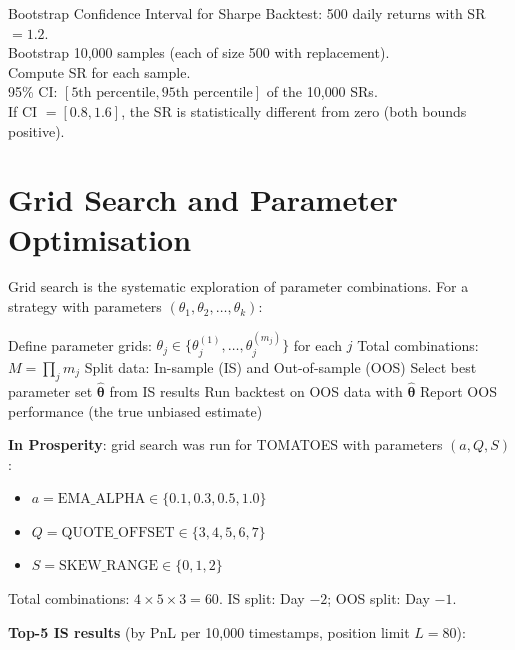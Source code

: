 \documentclass[12pt,a4paper,openany]{report}
\theoremstyle{definition}
\begin{document}
\begin{examplebox}{Bootstrap Confidence Interval for Sharpe}
Backtest: 500 daily returns with SR $= 1.2$. \\
Bootstrap 10{,}000 samples (each of size 500 with replacement). \\
Compute SR for each sample. \\
95\% CI: $[\text{5th percentile}, \text{95th percentile}]$ of the 10{,}000 SRs. \\
If CI $= [0.8, 1.6]$, the SR is statistically different from zero (both bounds positive).
\end{examplebox}

\section{Grid Search and Parameter Optimisation}

Grid search is the systematic exploration of parameter combinations. For a strategy with parameters $(\theta_1, \theta_2, \ldots, \theta_k)$:

\begin{algorithm}[H]
\caption{Grid Search with Walk-Forward Validation}
\SetAlgoLined
Define parameter grids: $\theta_j \in \{\theta_j^{(1)}, \ldots, \theta_j^{(m_j)}\}$ for each $j$\;
Total combinations: $M = \prod_j m_j$\;
Split data: In-sample (IS) and Out-of-sample (OOS)\;
Select best parameter set $\hat{\boldsymbol{\theta}}$ from IS results\;
Run backtest on OOS data with $\hat{\boldsymbol{\theta}}$\;
Report OOS performance (the true unbiased estimate)\;
\end{algorithm}

\textbf{In Prosperity}: grid search was run for TOMATOES with parameters $(a, Q, S)$:
\begin{itemize}
  \item $a = \text{EMA\_ALPHA} \in \{0.1, 0.3, 0.5, 1.0\}$
  \item $Q = \text{QUOTE\_OFFSET} \in \{3, 4, 5, 6, 7\}$
  \item $S = \text{SKEW\_RANGE} \in \{0, 1, 2\}$
\end{itemize}
Total combinations: $4 \times 5 \times 3 = 60$. IS split: Day $-2$; OOS split: Day $-1$.

\textbf{Top-5 IS results} (by PnL per 10{,}000 timestamps, position limit $L = 80$):
\end{document}
